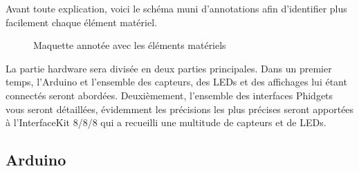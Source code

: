Avant toute explication, voici le schéma muni d’annotations afin d’identifier plus facilement chaque élément matériel.\\

\begin{figure}[H]
    \begin{center}

        \caption{Maquette annotée avec les éléments matériels}
    \end{center}
\end{figure}

La partie hardware sera divisée en deux parties principales. Dans un premier temps, l’Arduino et l’ensemble des capteurs, des LEDs et des affichages lui étant connectés seront abordées. Deuxièmement, l’ensemble des interfaces Phidgets vous seront détaillées, évidemment les précisions les plus précises seront apportées à l’InterfaceKit 8/8/8 qui a recueilli une multitude de capteurs et de LEDs.\\

\subsection{Arduino}
